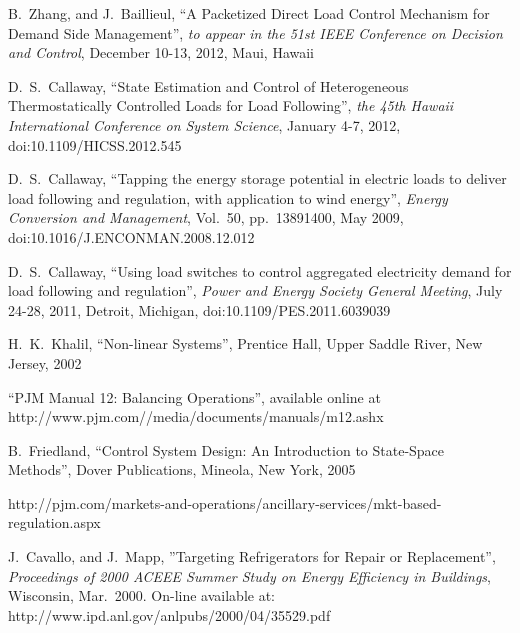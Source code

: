 \documentclass[journal]{IEEEtran}
\begin{document}
\begin{thebibliography}{20}
 B.~Zhang, and J.~Baillieul, ``A Packetized Direct Load Control Mechanism for Demand Side Management'', \textit{to appear in the 51st IEEE Conference on Decision and Control}, December 10-13, 2012, Maui, Hawaii

 D.~S.~Callaway, ``State Estimation and Control of Heterogeneous Thermostatically Controlled Loads for Load Following'', \textit{the 45th Hawaii International Conference on System Science}, January 4-7, 2012, doi:10.1109/HICSS.2012.545 

 D.~S.~Callaway, ``Tapping the energy storage potential in electric loads to deliver load following and regulation, with application to wind energy'', \textit{Energy Conversion and Management}, Vol.~50, pp.~13891400, May 2009, doi:10.1016/J.ENCONMAN.2008.12.012

 D.~S.~Callaway, ``Using load switches to control aggregated electricity demand for load following and regulation'', \textit{Power and Energy Society General Meeting}, July 24-28, 2011, Detroit, Michigan, doi:10.1109/PES.2011.6039039 

 H.~K.~Khalil, ``Non-linear Systems'', Prentice Hall, Upper Saddle River, New Jersey, 2002

 ``PJM Manual 12: Balancing Operations'', available online at http://www.pjm.com//media/documents/manuals/m12.ashx

 B.~Friedland, ``Control System Design: An Introduction to State-Space Methods'', Dover Publications, Mineola, New York, 2005

 http://pjm.com/markets-and-operations/ancillary-services/mkt-based-regulation.aspx

 J.~Cavallo, and J.~Mapp, ''Targeting Refrigerators for Repair or Replacement'', \textit{Proceedings of 2000 ACEEE Summer Study on Energy Efficiency in Buildings}, Wisconsin, Mar.~2000. On-line available at: http://www.ipd.anl.gov/anlpubs/2000/04/35529.pdf
\end{thebibliography}
\end{document}
